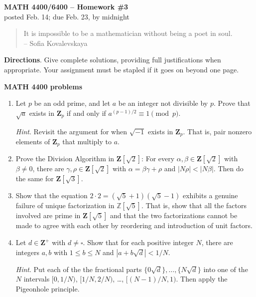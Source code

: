 \documentclass[12pt]{article}
\def\Z{\mathbf{Z}}
\begin{document}
\thispagestyle{empty} \begin{center} {\textbf{MATH 4400/6400 --
Homework \#3}\\ posted Feb. 14; due Feb. 23, by midnight}
\end{center}

{\scriptsize \begin{quote} It is impossible to be a mathematician without being a poet in soul.\\
    -- Sofia Kovalevskaya\end{quote}}


\vskip 10pt \noindent\textbf{Directions}. Give complete solutions, providing full justifications when appropriate. Your assignment must be stapled if it goes on beyond one page.

\vskip 10pt \noindent\textbf{MATH 4400 problems}
\begin{enumerate}
\item Let $p$ be an odd prime, and let $a$ be an integer not divisible by $p$. Prove that $\sqrt{a}$ exists in $\Z_p$ if and only if $a^{(p-1)/2} \equiv 1\pmod{p}$.

{\scriptsize \emph{Hint}. Revisit the argument for when $\sqrt{-1}$ exists in $\Z_p$. That is, pair nonzero elements of $\Z_p$ that multiply to $a$.}

\item Prove the Division Algorithm in $\Z[\sqrt{2}]$: For every $\alpha, \beta \in \Z[\sqrt{2}]$ with $\beta \ne 0$, there are $\gamma, \rho \in \Z[\sqrt{2}]$ with $\alpha = \beta\gamma+\rho$ and $|N\rho| < |N\beta|$. Then do the same for $\Z[\sqrt{3}]$.

\item Show  that the equation $2\cdot 2 = (\sqrt{5}+1)(\sqrt{5}-1)$ exhibits a genuine failure of unique factorization in $\mathbb{Z}[\sqrt{5}]$. That is, show that all the factors involved are prime in $\Z[\sqrt{5}]$ and that the two factorizations cannot be made to agree with each other by reordering and introduction of unit factors.

\item Let $d \in \Z^{+}$ with $d\ne \square$. Show that for each positive integer $N$, there are integers $a, b$ with $1 \le b \le N$ and $|a+b\sqrt{d}| < 1/N$.

{\scriptsize \emph{Hint}. Put each of the the fractional parts $\{0\sqrt{d}\}, \dots, \{N\sqrt{d}\}$ into one of the $N$ intervals  $[0,1/N)$, $[1/N, 2/N)$, \dots, $[(N-1)/N,1)$. Then apply the Pigeonhole principle.}


\end{enumerate}
\end{document}
